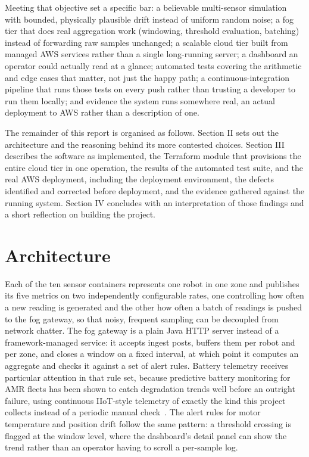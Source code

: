 \documentclass[conference]{IEEEtran}
\begin{document}
Meeting that objective set a specific bar: a believable multi-sensor simulation with bounded, physically plausible drift instead of uniform random noise; a fog tier that does real aggregation work (windowing, threshold evaluation, batching) instead of forwarding raw samples unchanged; a scalable cloud tier built from managed AWS services rather than a single long-running server; a dashboard an operator could actually read at a glance; automated tests covering the arithmetic and edge cases that matter, not just the happy path; a continuous-integration pipeline that runs those tests on every push rather than trusting a developer to run them locally; and evidence the system runs somewhere real, an actual deployment to AWS rather than a description of one.

The remainder of this report is organised as follows. Section II sets out the architecture and the reasoning behind its more contested choices. Section III describes the software as implemented, the Terraform module that provisions the entire cloud tier in one operation, the results of the automated test suite, and the real AWS deployment, including the deployment environment, the defects identified and corrected before deployment, and the evidence gathered against the running system. Section IV concludes with an interpretation of those findings and a short reflection on building the project.

\section{Architecture}

Each of the ten sensor containers represents one robot in one zone and publishes its five metrics on two independently configurable rates, one controlling how often a new reading is generated and the other how often a batch of readings is pushed to the fog gateway, so that noisy, frequent sampling can be decoupled from network chatter. The fog gateway is a plain Java HTTP server instead of a framework-managed service: it accepts ingest posts, buffers them per robot and per zone, and closes a window on a fixed interval, at which point it computes an aggregate and checks it against a set of alert rules. Battery telemetry receives particular attention in that rule set, because predictive battery monitoring for AMR fleets has been shown to catch degradation trends well before an outright failure, using continuous IIoT-style telemetry of exactly the kind this project collects instead of a periodic manual check~\cite{ref5}. The alert rules for motor temperature and position drift follow the same pattern: a threshold crossing is flagged at the window level, where the dashboard's detail panel can show the trend rather than an operator having to scroll a per-sample log.
\end{document}
